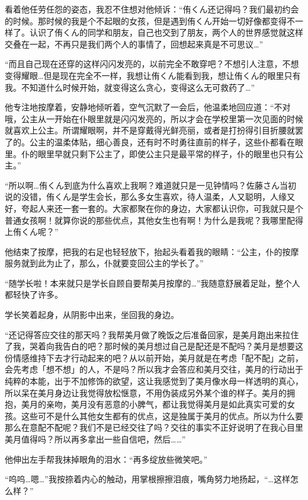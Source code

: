 看着他任劳任怨的姿态，我忍不住想对他倾诉：“侑くん还记得吗？我们最初约会的时候。那时候的我是个不起眼的女孩，但是遇到侑くん开始一切好像都变得不一样了。认识了侑くん的同学和朋友，自己也交到了朋友，两个人的世界感觉就这样交叠在一起，不再只是我们两个人的事情了，回想起来真是不可思议…”

“而且自己现在还穿的这样闪闪发亮的，以前完全不敢穿吧？不想引人注意，不想变得耀眼…但是现在完全不一样，我想让侑くん能看到我，想让侑くん的眼里只有我。不知道什么时候开始，就变得这么贪心，变得这么无可救药了…”

他专注地按摩着，安静地倾听着，空气沉默了一会后，他温柔地回应道：“不对哦，公主从一开始在仆眼里就是闪闪发亮的，所以才会在学校里第一次见面的时候就喜欢上公主。所谓耀眼啊，并不是穿戴得光鲜亮丽，或者是打扮得引目折腰就罢了的。公主的温柔体贴，细心善良，还有时不时勇往直前的样子，这些仆都看在眼里。仆的眼里早就只剩下公主了，即使公主只是最平常的样子，仆的眼里也只有公主。”

“所以啊…侑くん到底为什么喜欢上我啊？难道就只是一见钟情吗？佐藤さん当初说的没错，侑くん是学生会长，那么多女生喜欢，待人温柔，人又聪明，人缘又好，夸起人来还一套一套的。大家都聚在你的身边，大家都认识你，可我就只是个普通女孩啊！就算你说的那些优点，其他女生也有啊！为什么是我呢？我哪里配得上侑くん呢？”

他结束了按摩，把我的右足也轻轻放下，抬起头看着我的眼睛：“公主，仆的按摩服务就到此为止了，那么，仆就要变回公主的学长了。”

“随学长啦！本来就只是学长自顾自要帮美月按摩的…”我随意舒展着足趾，整个人都轻快了许多。

学长笑着起身，从阴影中出来，坐回我的身边。

“还记得答应交往的那天吗？我帮美月做了晚饭之后准备回家，是美月跑出来拉住了我，哭着向我告白的吧？那时候的美月想过自己是配还是不配吗？美月是想要这份情感维持下去才行动起来的吧？从以前开始，美月就是在考虑「配不配」之前，会先考虑「想不想」的人，不是吗？所以我才会答应和美月交往，美月的行动出于纯粹的本能，出于不加修饰的欲望，这让我感觉到了美月像水母一样透明的真心，所以呆在美月身边让我觉得放松惬意，不用伪装成另外某个谁的样子。美月的拥抱，美月的亲吻，美月没有恶意的小脾气，都让我觉得美月是如此真实可爱的女孩。这些可不是什么其他女生都有的优点，这是独属于美月的优点。所以为什么要那么在意配不配呢？我们不是已经交往了吗？交往的事实不正好说明了在我心目里美月值得吗？所以再多拿出一些自信吧，然后……”

他伸出左手帮我抹掉眼角的泪水：“再多绽放些微笑吧。”

“呜呜…嗯…”我按捺着内心的触动，用掌根擦擦泪痕，嘴角努力地扬起，“…这样怎么样？”

